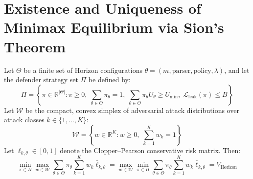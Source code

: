 \section{Existence and Uniqueness of Minimax Equilibrium via Sion's Theorem}
\label{app:proof_sion}

\begin{theorem}
Let $\Theta$ be a finite set of Horizon configurations $\theta = (m, \text{parser}, \text{policy}, \lambda)$, and let the defender strategy set $\Pi$ be defined by:
\begin{equation}
    \Pi = \left\{ \pi \in \mathbb{R}^{|\Theta|} : \pi \ge 0, \; \sum_{\theta \in \Theta} \pi_\theta = 1, \; \sum_{\theta \in \Theta} \pi_\theta U_\theta \ge U_{\min}, \; \mathcal{L}_{\mathrm{leak}}(\pi) \le B \right\}
\end{equation}
Let $\mathcal{W}$ be the compact, convex simplex of adversarial attack distributions over attack classes $k \in \{1, \dots, K\}$:
\begin{equation}
    \mathcal{W} = \left\{ w \in \mathbb{R}^K : w \ge 0, \; \sum_{k=1}^K w_k = 1 \right\}
\end{equation}
Let $\bar{\ell}_{k, \theta} \in [0, 1]$ denote the Clopper--Pearson conservative risk matrix. Then:
\begin{equation}
    \min_{\pi \in \Pi} \max_{w \in \mathcal{W}} \sum_{\theta \in \Theta} \pi_\theta \sum_{k=1}^K w_k \bar{\ell}_{k, \theta} = \max_{w \in \mathcal{W}} \min_{\pi \in \Pi} \sum_{\theta \in \Theta} \pi_\theta \sum_{k=1}^K w_k \bar{\ell}_{k, \theta} = V_{\mathrm{Horizon}}
\end{equation}
\end{theorem}

